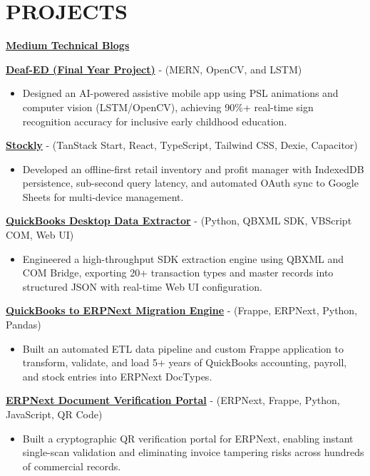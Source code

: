 \documentclass[11pt]{article}
\newcommand{\rSection}[1]{\section{\uppercase{#1}}}
\begin{document}
\rSection{Projects}

\faMedium{} \href{https://medium.com/@usmanamjad495}{\textbf{Medium Technical Blogs}}

\href{https://github.com/MaAn-41/Deaf-Ed}{\textbf{Deaf-ED (Final Year Project)}} - (MERN, OpenCV, and LSTM)  
\begin{itemize}[noitemsep,topsep=2pt] 
  \item Designed an AI-powered assistive mobile app using PSL animations and computer vision (LSTM/OpenCV), achieving 90\%+ real-time sign recognition accuracy for inclusive early childhood education.
\end{itemize}

\href{https://github.com/usmanagro7c-eng/Stockly}{\textbf{Stockly}} - (TanStack Start, React, TypeScript, Tailwind CSS, Dexie, Capacitor)  
\begin{itemize}[noitemsep,topsep=2pt] 
  \item Developed an offline-first retail inventory and profit manager with IndexedDB persistence, sub-second query latency, and automated OAuth sync to Google Sheets for multi-device management.
\end{itemize}

\href{https://github.com/tushar-javaid/QuickBook_Desktop_Data_Extractor}{\textbf{QuickBooks Desktop Data Extractor}} - (Python, QBXML SDK, VBScript COM, Web UI)  
\begin{itemize}[noitemsep,topsep=2pt] 
  \item Engineered a high-throughput SDK extraction engine using QBXML and COM Bridge, exporting 20+ transaction types and master records into structured JSON with real-time Web UI configuration.
\end{itemize}

\href{https://github.com/MaAn-41}{\textbf{QuickBooks to ERPNext Migration Engine}} - (Frappe, ERPNext, Python, Pandas)  
\begin{itemize}[noitemsep,topsep=2pt] 
  \item Built an automated ETL data pipeline and custom Frappe application to transform, validate, and load 5+ years of QuickBooks accounting, payroll, and stock entries into ERPNext DocTypes.
\end{itemize}

\href{https://github.com/usmanagro7c-eng/ERPNext-Document-Verification}{\textbf{ERPNext Document Verification Portal}} - (ERPNext, Frappe, Python, JavaScript, QR Code)  
\begin{itemize}[noitemsep,topsep=2pt] 
  \item Built a cryptographic QR verification portal for ERPNext, enabling instant single-scan validation and eliminating invoice tampering risks across hundreds of commercial records.
\end{itemize}
\end{document}
